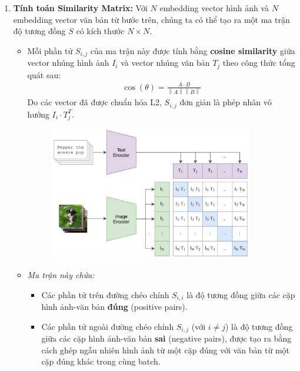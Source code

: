 \begin{enumerate}
    \item \textbf{Tính toán Similarity Matrix:}
    Với $N$ embedding vector hình ảnh và $N$ embedding vector văn bản từ bước trên, chúng ta có thể tạo ra một ma trận độ tương đồng $S$ có kích thước $N \times N$.
    \begin{itemize}
        \item Mỗi phần tử $S_{i,j}$ của ma trận này được tính bằng \textbf{cosine similarity} giữa vector nhúng hình ảnh $I_i$ và vector nhúng văn bản $T_j$ theo công thức tổng quát sau:
        \begin{align*}
            \cos(\theta) = \frac{A \cdot B}{\left\lVert A \right\rVert \left\lVert B \right\rVert}
        \end{align*}
        Do các vector đã được chuẩn hóa L2, $S_{i,j}$ đơn giản là phép nhân vô hướng $I_i \cdot T_j^T$.
        \begin{figure}[H]
            \centering
            \includegraphics[width=0.9\textwidth]{img/03-similarity_matrix.png}
            \label{fig:zero_shot_comparison}
        \end{figure}
        \item \textit{Ma trận này chứa:}
        \begin{itemize}
            \item Các phần tử trên đường chéo chính $S_{i,i}$ là độ tương đồng giữa các cặp hình ảnh-văn bản \textbf{đúng} (positive pairs).
            \item Các phần tử ngoài đường chéo chính $S_{i,j}$ (với $i \neq j$) là độ tương đồng giữa các cặp hình ảnh-văn bản \textbf{sai} (negative pairs), được tạo ra bằng cách ghép ngẫu nhiên hình ảnh từ một cặp đúng với văn bản từ một cặp đúng khác trong cùng batch.
        \end{itemize}
    \end{itemize}


\end{enumerate}
